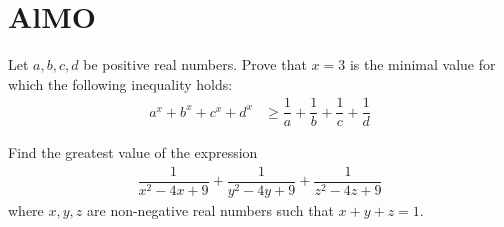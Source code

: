 \documentclass{subfile}
\begin{document}
	\section{AlMO}\label{sec:almo}
	
		\begin{problem}
			Let $a,b,c,d$ be positive real numbers. Prove that $x=3$ is the minimal value for which the following inequality holds:
				\begin{align*}
					a^{x}+b^{x}+c^{x}+d^{x}
						& \geq\dfrac{1}{a}+\dfrac{1}{b}+\dfrac{1}{c}+\dfrac{1}{d}
				\end{align*}
		\end{problem}
	
		\begin{problem}
			Find the greatest value of the expression
				\begin{align*}
					\dfrac{1}{x^{2}-4x+9}+\dfrac{1}{y^{2}-4y+9}+\dfrac{1}{z^{2}-4z+9}
				\end{align*}
			where $x,y,z$ are non-negative real numbers such that $x+y+z=1$.
		\end{problem}
\end{document}
